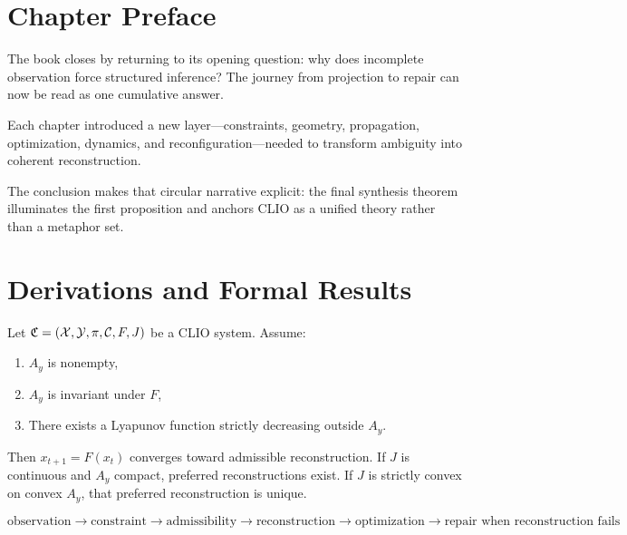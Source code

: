 \section{Chapter Preface}
The book closes by returning to its opening question: why does incomplete observation force structured inference? The journey from projection to repair can now be read as one cumulative answer.

Each chapter introduced a new layer—constraints, geometry, propagation, optimization, dynamics, and reconfiguration—needed to transform ambiguity into coherent reconstruction.

The conclusion makes that circular narrative explicit: the final synthesis theorem illuminates the first proposition and anchors CLIO as a unified theory rather than a metaphor set.

\section{Derivations and Formal Results}
\begin{theorem}
Let \(\mathfrak C=(\mathcal{X},\mathcal{Y},\pi,\mathcal{C},F,J)\) be a CLIO system. Assume:
\begin{enumerate}
  \item \(A_y\) is nonempty,
  \item \(A_y\) is invariant under \(F\),
  \item There exists a Lyapunov function strictly decreasing outside \(A_y\).
\end{enumerate}
Then \(x_{t+1}=F(x_t)\) converges toward admissible reconstruction. If \(J\) is continuous and \(A_y\) compact, preferred reconstructions exist. If \(J\) is strictly convex on convex \(A_y\), that preferred reconstruction is unique.
\end{theorem}

\[
\boxed{\text{observation}\to\text{constraint}\to\text{admissibility}\to\text{reconstruction}\to\text{optimization}\to\text{repair when reconstruction fails}}
\]
